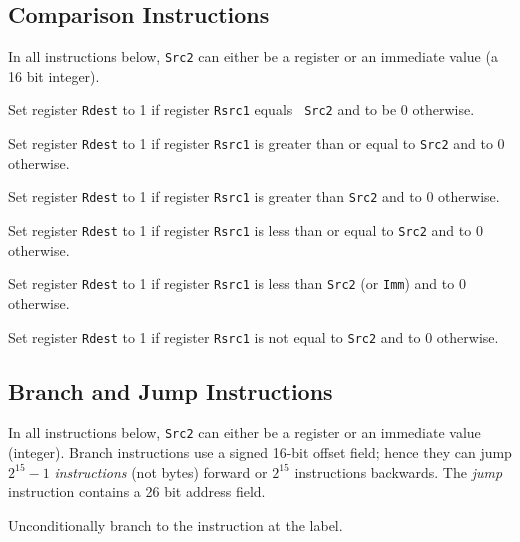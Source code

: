 \documentclass[11pt]{article}
\begin{document}
\subsection {Comparison Instructions}

In all instructions below, {\tt Src2} can either be a register or an
immediate value (a 16 bit integer).

Set register {\tt Rdest} to 1 if register {\tt Rsrc1} equals {\tt
Src2} and to be 0 otherwise.

Set register {\tt Rdest} to 1 if register {\tt Rsrc1} is greater
than or equal to {\tt Src2} and to 0 otherwise.

Set register {\tt Rdest} to 1 if register {\tt Rsrc1} is greater
than {\tt Src2} and to 0 otherwise.

Set register {\tt Rdest} to 1 if register {\tt Rsrc1} is less than
or equal to {\tt Src2} and to 0 otherwise.

Set register {\tt Rdest} to 1 if register {\tt Rsrc1} is less than
{\tt Src2} (or {\tt Imm}) and to 0 otherwise.

Set register {\tt Rdest} to 1 if register {\tt Rsrc1} is not equal
to {\tt Src2} and to 0 otherwise.


\subsection {Branch and Jump Instructions}

In all instructions below, {\tt Src2} can either be a register or an
immediate value (integer).  Branch instructions use a signed 16-bit
offset field; hence they can jump $2^{15}-1$ {\em instructions\/} (not
bytes) forward or $2^{15}$ instructions backwards.  The {\em jump\/}
instruction contains a 26 bit address field.

Unconditionally branch to the instruction at the label.
\end{document}
